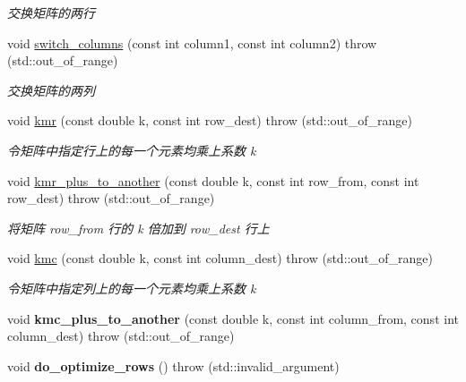\begin{DoxyCompactItemize}
\begin{DoxyCompactList}\small\item\em 交换矩阵的两行 \end{DoxyCompactList}\item 
void \hyperlink{classkerbal_1_1math_1_1_matrix_a47ee8c0afe98e4545233b10f7f7774e8}{switch\+\_\+columns} (const int column1, const int column2)  throw (std\+::out\+\_\+of\+\_\+range)
\begin{DoxyCompactList}\small\item\em 交换矩阵的两列 \end{DoxyCompactList}\item 
void \hyperlink{classkerbal_1_1math_1_1_matrix_add7ad7a55135e85d44437aaceb13ea02}{kmr} (const double k, const int row\+\_\+dest)  throw (std\+::out\+\_\+of\+\_\+range)
\begin{DoxyCompactList}\small\item\em 令矩阵中指定行上的每一个元素均乘上系数 k \end{DoxyCompactList}\item 
void \hyperlink{classkerbal_1_1math_1_1_matrix_aed63e5a9858d007ceaf95efb0f66c221}{kmr\+\_\+plus\+\_\+to\+\_\+another} (const double k, const int row\+\_\+from, const int row\+\_\+dest)  throw (std\+::out\+\_\+of\+\_\+range)
\begin{DoxyCompactList}\small\item\em 将矩阵 row\+\_\+from 行的 k 倍加到 row\+\_\+dest 行上 \end{DoxyCompactList}\item 
void \hyperlink{classkerbal_1_1math_1_1_matrix_aed36c6097e228052c76e437a4cb195b7}{kmc} (const double k, const int column\+\_\+dest)  throw (std\+::out\+\_\+of\+\_\+range)
\begin{DoxyCompactList}\small\item\em 令矩阵中指定列上的每一个元素均乘上系数 k \end{DoxyCompactList}\item 
\mbox{\label{classkerbal_1_1math_1_1_matrix_aa7cc2a11d47aa71b7609c4e92cb86b1c}} 
void {\bfseries kmc\+\_\+plus\+\_\+to\+\_\+another} (const double k, const int column\+\_\+from, const int column\+\_\+dest)  throw (std\+::out\+\_\+of\+\_\+range)
\item 
\mbox{\label{classkerbal_1_1math_1_1_matrix_abceaa9468b6280a4d3dfd6fe34141ac1}} 
void {\bfseries do\+\_\+optimize\+\_\+rows} ()  throw (std\+::invalid\+\_\+argument)

\end{DoxyCompactItemize}
